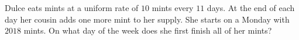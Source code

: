 Dulce eats mints at a uniform rate of $10$ mints every $11$ days. At the end of each day her cousin adds one more mint to her supply. She starts on a Monday with $2018$ mints. On what day of the week does she first finish all of her mints?
